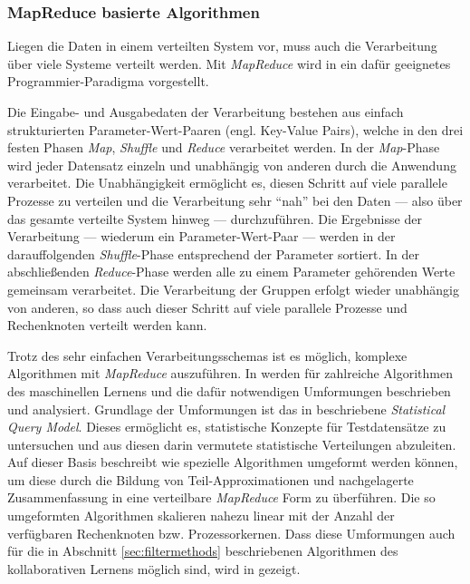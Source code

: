 \subsubsection{MapReduce basierte Algorithmen}\label{sec:mapred}

Liegen die Daten in einem verteilten System vor, muss auch die Verarbeitung über viele Systeme verteilt werden. Mit \textit{MapReduce} wird in \citep{mapred04} ein dafür geeignetes Programmier-Paradigma vorgestellt. 

 Die Eingabe- und Ausgabedaten der Verarbeitung bestehen aus einfach strukturierten Parameter-Wert-Paaren (engl. Key-Value Pairs), welche in den drei festen Phasen \textit{Map}, \textit{Shuffle} und \textit{Reduce} verarbeitet werden. In der \textit{Map}-Phase wird jeder Datensatz einzeln und unabhängig von anderen durch die Anwendung verarbeitet. Die Unabhängigkeit ermöglicht es, diesen Schritt auf viele parallele Prozesse zu verteilen und die Verarbeitung sehr ``nah'' bei den Daten --- also über das gesamte verteilte System hinweg --- durchzuführen. Die Ergebnisse der Verarbeitung --- wiederum ein Parameter-Wert-Paar --- werden in der darauffolgenden  \textit{Shuffle}-Phase entsprechend der Parameter sortiert. In der abschließenden  \textit{Reduce}-Phase werden alle zu einem Parameter gehörenden Werte gemeinsam verarbeitet. Die Verarbeitung der Gruppen erfolgt wieder unabhängig von anderen, so dass auch dieser Schritt auf viele parallele Prozesse und Rechenknoten verteilt werden kann. \citep{mapred04} 

Trotz des sehr einfachen Verarbeitungsschemas ist es möglich, komplexe Algorithmen mit \textit{MapReduce} auszuführen. In \citep{mapred06} werden für zahlreiche Algorithmen des maschinellen Lernens und die dafür notwendigen Umformungen beschrieben und analysiert. Grundlage der Umformungen ist das in \citep{Kearns98} beschriebene \textit{Statistical Query Model}. Dieses ermöglicht es, statistische Konzepte für Testdatensätze zu untersuchen und aus diesen darin vermutete statistische Verteilungen abzuleiten. Auf dieser Basis beschreibt \citep{mapred06} wie spezielle Algorithmen umgeformt werden können, um diese durch die Bildung von Teil-Approximationen und nachgelagerte Zusammenfassung in eine verteilbare \textit{MapReduce} Form zu überführen. Die so umgeformten Algorithmen skalieren nahezu linear mit der Anzahl der verfügbaren Rechenknoten bzw. Prozessorkernen. Dass diese Umformungen auch für die in Abschnitt \ref{sec:filtermethods}  beschriebenen Algorithmen des kollaborativen Lernens möglich sind, wird in \citep{jiang11} gezeigt. \citep{mapred06} 

